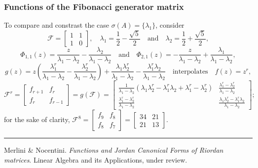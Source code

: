\documentclass[9pt]{beamer}
\begin{document}
\begin{frame}[fragile]
\frametitle{Functions of the Fibonacci generator matrix}
To compare and constrast the case $\sigma(A)=\lbrace \lambda_{1} \rbrace$, consider
\begin{displaymath}
\mathcal{F} = \left[\begin{matrix}1 & 1\\1 & 0\end{matrix}\right],
\quad  \lambda_{1} =  \frac{1}{2}- \frac{\sqrt{5}}{2}
\quad\text{and}\quad \lambda_{2} = \frac{1}{2} + \frac{\sqrt{5}}{2},
\end{displaymath}
\begin{displaymath}
\Phi_{ 1, 1 }{\left (z \right )} = \frac{z}{\lambda_{1} - \lambda_{2}} - \frac{\lambda_{2}}{\lambda_{1} - \lambda_{2}} 
\quad\text{and}\quad \Phi_{ 2, 1 }{\left (z \right )} = - \frac{z}{\lambda_{1} - \lambda_{2}} + \frac{\lambda_{1}}{\lambda_{1} - \lambda_{2}},
\end{displaymath}
\begin{displaymath}
g{\left (z \right )} = z \left(\frac{\lambda_{1}^{r}}{\lambda_{1} - \lambda_{2}} - \frac{\lambda_{2}^{r}}{\lambda_{1} - \lambda_{2}}\right) + \frac{\lambda_{1} \lambda_{2}^{r}}{\lambda_{1} - \lambda_{2}} - \frac{\lambda_{1}^{r} \lambda_{2}}{\lambda_{1} - \lambda_{2}}\quad\text{interpolates}\quad f(z)=z^{r},
\end{displaymath}
\begin{displaymath}
\mathcal{F}^{r} = \left[\begin{matrix}f_{r+1} & f_{r}\\f_{r} & f_{r-1}\end{matrix}\right] =g(\mathcal{F})=\left[\begin{matrix}\frac{1}{\lambda_{1} - \lambda_{2}} \left(\lambda_{1} \lambda_{2}^{r} - \lambda_{1}^{r} \lambda_{2} + \lambda_{1}^{r} - \lambda_{2}^{r}\right) & \frac{\lambda_{1}^{r} - \lambda_{2}^{r}}{\lambda_{1} - \lambda_{2}}\\\frac{\lambda_{1}^{r} - \lambda_{2}^{r}}{\lambda_{1} - \lambda_{2}} & \frac{\lambda_{1} \lambda_{2}^{r} - \lambda_{1}^{r} \lambda_{2}}{\lambda_{1} - \lambda_{2}}\end{matrix}\right];
\end{displaymath}
for the sake of clarity, 
$\displaystyle\mathcal{F}^{8} = \left[\begin{matrix}f_{9} & f_{8}\\f_{8} & f_{7}\end{matrix}\right] = \left[\begin{matrix}34 & 21\\21 & 13\end{matrix}\right].$
\vfill
\noindent\rule{\textwidth}{0.1pt}
{\footnotesize
Merlini \& Nocentini. \textit{Functions and Jordan Canonical Forms of Riordan
matrices}. \newline Linear Algebra and its Applications, under review.}
\end{frame}
\end{document}
